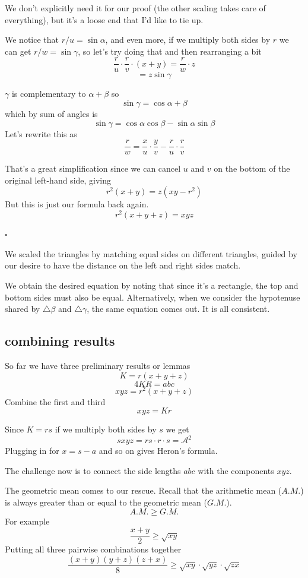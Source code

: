 \documentclass[11pt, oneside]{article}
\begin{document}
We don't explicitly need it for our proof (the other scaling takes care of everything), but it's a loose end that I'd like to tie up.

We notice that $r/u = \sin \alpha$, and even more, if we multiply both sides by $r$ we can get $r/w = \sin \gamma$, so let's try doing that and then rearranging a bit
\[ \frac{r}{u} \cdot \frac{r}{v} \cdot (x + y) = \frac{r}{w} \cdot z \]
\[ = z \sin \gamma \]

$\gamma$ is complementary to $\alpha + \beta$ so
\[ \sin \gamma = \cos \alpha + \beta \] 
which by sum of angles is
\[\sin \gamma = \cos \alpha \cos \beta - \sin \alpha \sin \beta \]
Let's rewrite this as
\[ \frac{r}{w} = \frac{x}{u} \cdot \frac{y}{v} - \frac{r}{u} \cdot \frac{r}{v} \]

That's a great simplification since we can cancel $u$ and $v$ on the bottom of the original left-hand side, giving
\[ r^2 (x + y) = z(xy - r^2) \]
But this is just our formula back again.
\[ r^2 (x + y + z) = xyz \]

$\square$

We scaled the triangles by matching equal sides on different triangles, guided by our desire to have the distance on the left and right sides match.

We obtain the desired equation by noting that since it's a rectangle, the top and bottom sides must also be equal.  Alternatively, when we consider the hypotenuse shared by $\triangle \beta$ and $\triangle \gamma$, the same equation comes out.  It is all consistent.

\subsection*{combining results}

So far we have three preliminary results or lemmas
\[ K = r(x + y + z) \]
\[ 4KR = abc \]
\[ xyz = r^2(x + y + z) \]
Combine the first and third
\[ xyz = Kr \]

Since $K = rs$ if we multiply both sides by $s$ we get
\[ sxyz = rs \cdot r \cdot s = \mathcal{A}^2  \]
Plugging in for $x = s - a$ and so on gives Heron's formula.

The challenge now is to connect the side lengths $abc$ with the components $xyz$.  

The geometric mean comes to our rescue.  Recall that the arithmetic mean ($A.M.$) is always greater than or equal to the geometric mean ($G.M.$).
\[ A.M. \ge G.M. \]
For example
\[ \frac{x + y}{2} \ge \sqrt{xy} \]
Putting all three pairwise combinations together
\[ \frac{(x + y)(y + z)(z + x)}{8} \ge \sqrt{xy} \cdot \sqrt{yz} \cdot \sqrt{zx} \]
\end{document}
